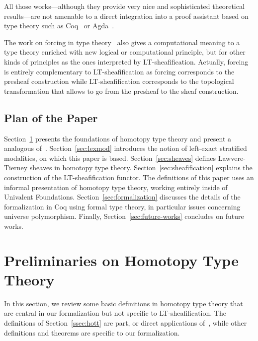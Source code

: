 \documentclass[preprint,9pt,numbers]{sigplanconf}
\begin{document}
All those works---although they provide very nice and sophisticated
theoretical results---are not amenable to a direct integration into a
proof assistant based on type theory such as Coq~\cite{coq:refman:8.4}
or Agda~\cite{norell2007towards}.

The work on forcing in type theory~\cite{jaber2012extending} also
gives a computational meaning to a type theory enriched with new
logical or computational principle, but for other kinds of principles
as the ones interpreted by LT-sheafification.
%
Actually, forcing is entirely complementary to LT-sheafification as
forcing corresponds to the presheaf construction while
LT-sheafification corresponds to the topological transformation that
allows to go from the presheaf to the sheaf construction.    

\subsection{Plan of the Paper}

Section~\ref{sec:hott} presents the foundations of homotopy type theory
and present a analogous of~\cite[Corollary 6.2.3.5]{lurie}. 
%
Section~\ref{sec:lexmod} introduces the notion of left-exact stratified
modalities, on which this paper is based.
%
Section~\ref{sec:sheaves} defines Lawvere-Tierney sheaves in homotopy
type theory.
%
Section~\ref{sec:sheafification} explains the construction of the
LT-sheafification functor.
%
The definitions of this paper uses an informal presentation of
homotopy type theory, working entirely inside of Univalent
Foundations. 
Section~\ref{sec:formalization} discusses the details of the
formalization in Coq using formal type theory, in particular issues
concerning universe polymorphism.
%
Finally, Section~\ref{sec:future-works} concludes on future works.


\section{Preliminaries on Homotopy Type Theory}
\label{sec:hott}

In this section, we review some basic definitions in homotopy type
theory that are central in our formalization but not specific to
LT-sheafification. 
The definitions of Section~\ref{ssec:hott} 
are part, or direct applications of~\cite{hottbook}, while other definitions
and theorems are specific to our formalization. 
\end{document}
